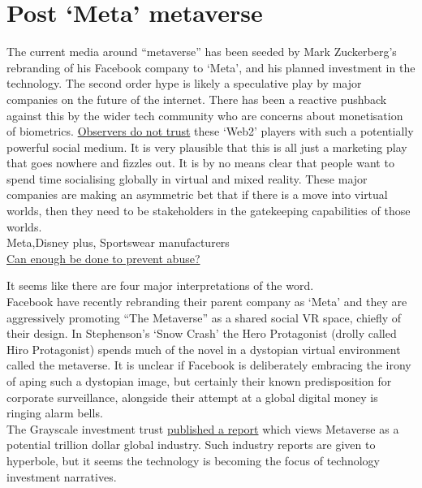 \section{Post `Meta' metaverse}
The current media around ``metaverse'' has been seeded by Mark Zuckerberg's rebranding of his Facebook company to `Meta', and his planned investment in the technology. The second order hype is likely a speculative play by major companies on the future of the internet. There has been a reactive pushback against this by the wider tech community who are concerns about monetisation of biometrics. \href{https://www.coindesk.com/layer2/2022/01/19/meta-leans-in-to-tracking-your-emotions-in-the-metaverse/}{Observers do not trust} these `Web2' players with such a potentially powerful social medium. It is very plausible that this is all just a marketing play that goes nowhere and fizzles out. It is by no means clear that people want to spend time socialising globally in virtual and mixed reality. These major companies are  making an asymmetric bet that if there is a move into virtual worlds, then they need to be stakeholders in the gatekeeping capabilities of those worlds.\\ 
Meta,Disney plus, Sportswear manufacturers\\

\href{https://medium.com/kabuni/fiction-vs-non-fiction-98aa0098f3b0}{Can enough be done to prevent abuse?}

It seems like there are four major interpretations of the word.\\

Facebook have recently rebranding their parent company as `Meta' and they are aggressively promoting ``The Metaverse'' as a shared social VR space, chiefly of their design. In Stephenson's `Snow Crash' the Hero Protagonist (drolly called Hiro Protagonist) spends much of the novel in a dystopian virtual environment called the metaverse. It is unclear if Facebook is deliberately embracing the irony of aping such a dystopian image, but certainly their known predisposition for corporate surveillance, alongside their attempt at a global digital money is ringing alarm bells.\\
The Grayscale investment trust \href{https://grayscale.com/wp-content/uploads/2021/11/Grayscale_Metaverse_Report_Nov2021.pdf}{published a report} which views Metaverse as a potential trillion dollar global industry. Such industry reports are given to hyperbole, but it seems the technology is becoming the focus of technology investment narratives.

